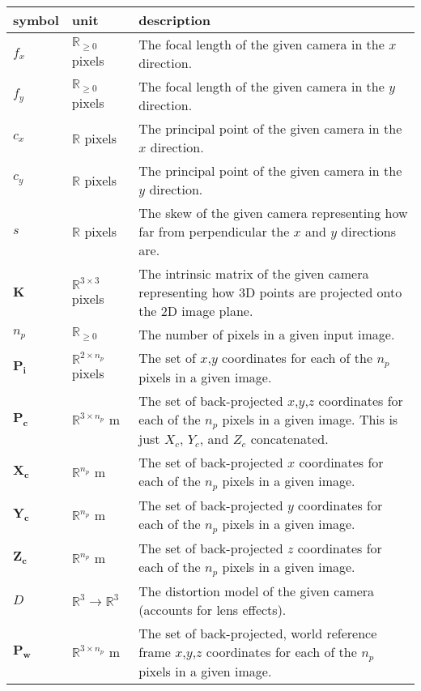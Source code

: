 \documentclass[12pt, titlepage]{article}
\begin{document}
\renewcommand{\arraystretch}{1.2}
\noindent \begin{longtable*}{l l p{12cm}} \toprule
\textbf{symbol} & \textbf{unit} & \textbf{description}\\
\midrule 
$f_x$ & $\mathbb{R}_{\geq0}$ pixels & The focal length of the given camera in the $x$ direction.
\\
$f_y$ & $\mathbb{R}_{\geq0}$ pixels & The focal length of the given camera in the $y$ direction.
\\
$c_x$ & $\mathbb{R}$ pixels & The principal point of the given camera in the $x$ direction.
\\
$c_y$ & $\mathbb{R}$ pixels & The principal point of the given camera in the $y$ direction.
\\
$s$ & $\mathbb{R}$ pixels & The skew of the given camera representing how far from perpendicular the $x$ and $y$ directions are.
\\
$\mathbf{K}$ & $\mathbb{R}^{3\times3}$ pixels & The intrinsic matrix of the given camera representing how 3D points are projected onto the 2D image plane.
\\
$n_p$ & $\mathbb{R}_{\geq0}$ & The number of pixels in a given input image.
\\
$\mathbf{P_i}$ & $\mathbb{R}^{2\times{}n_p}$ pixels & The set of $x$,$y$ coordinates for each of the $n_p$ pixels in a given image.
\\
$\mathbf{P_c}$ & $\mathbb{R}^{3\times{}n_p}$ m & The set of back-projected $x$,$y$,$z$ coordinates for each of the $n_p$ pixels in a given image. This is just $X_{c}$, $Y_{c}$, and $Z_{c}$ concatenated.
\\
$\mathbf{X_c}$ & $\mathbb{R}^{n_p}$ m & The set of back-projected $x$ coordinates for each of the $n_p$ pixels in a given image.
\\
$\mathbf{Y_c}$ & $\mathbb{R}^{n_p}$ m & The set of back-projected $y$ coordinates for each of the $n_p$ pixels in a given image.
\\
$\mathbf{Z_c}$ & $\mathbb{R}^{n_p}$ m & The set of back-projected $z$ coordinates for each of the $n_p$ pixels in a given image.
\\
$D$ & $\mathbb{R}^{3}\rightarrow{}\mathbb{R}^{3}$ & The distortion model of the given camera (accounts for lens effects).
\\
$\mathbf{P_w}$ & $\mathbb{R}^{3\times{}n_p}$ m & The set of back-projected, world reference frame $x$,$y$,$z$ coordinates for each of the $n_p$ pixels in a given image.

\end{longtable*}
\end{document}
